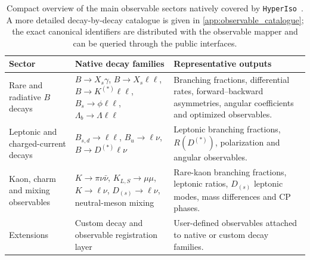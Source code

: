 \documentclass[preprint,11pt]{elsarticle}
\newcommand{\hi}{\texttt{HyperIso}}
\begin{document}
\begin{table}[!ht]
\centering
\small
\renewcommand{\arraystretch}{1.15}
\begin{tabularx}{\textwidth}{@{}p{}X X@{}}
\toprule
\textbf{Sector} & \textbf{Native decay families} & \textbf{Representative outputs} \\
\midrule
Rare and radiative $B$ decays &
$B\to X_s\gamma$, $B\to X_s\ell\ell$, $B\to K^{(*)}\ell\ell$, $B_s\to\phi\ell\ell$, $\Lambda_b\to\Lambda\ell\ell$ &
Branching fractions, differential rates, forward--backward asymmetries, angular coefficients and optimized observables. \\
\addlinespace
Leptonic and charged-current decays &
$B_{s,d}\to\ell\ell$, $B_u\to\ell\nu$, $B\to D^{(*)}\ell\nu$ &
Leptonic branching fractions, $R(D^{(*)})$, polarization and angular observables. \\
\addlinespace
Kaon, charm and mixing observables &
$K\to\pi\nu\bar\nu$, $K_{L,S}\to\mu\mu$, $K\to\ell\nu$, $D_{(s)}\to\ell\nu$, neutral-meson mixing &
Rare-kaon branching fractions, leptonic ratios, $D_{(s)}$ leptonic modes, mass differences and CP phases. \\
\addlinespace
Extensions &
Custom decay and observable registration layer &
User-defined observables attached to native or custom decay families. \\
\bottomrule
\end{tabularx}
\caption{Compact overview of the main observable sectors natively covered by \hi~. A more detailed decay-by-decay catalogue is given in \ref{app:observable_catalogue}; the exact canonical identifiers are distributed with the observable mapper and can be queried through the public interfaces.}
\label{tab:decays}
\end{table}
\end{document}
